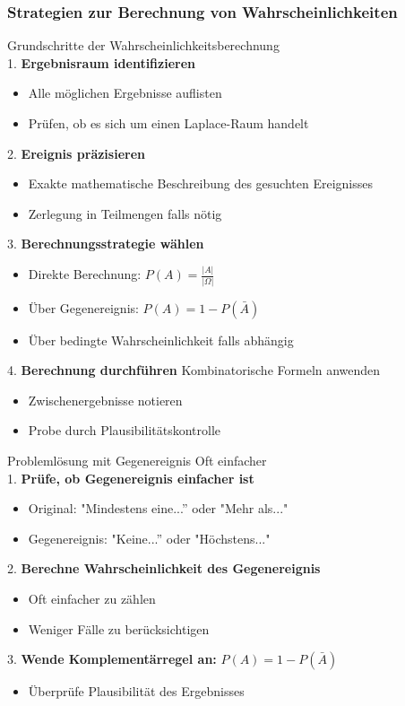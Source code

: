 \subsubsection{Strategien zur Berechnung von Wahrscheinlichkeiten}

\begin{KR}{Grundschritte der Wahrscheinlichkeitsberechnung}\\
1. \textbf{Ergebnisraum identifizieren}
   \begin{itemize}
   \item Alle möglichen Ergebnisse auflisten
   \item Prüfen, ob es sich um einen Laplace-Raum handelt
   \end{itemize}

2. \textbf{Ereignis präzisieren}
   \begin{itemize}
   \item Exakte mathematische Beschreibung des gesuchten Ereignisses
   \item Zerlegung in Teilmengen falls nötig
   \end{itemize}

3. \textbf{Berechnungsstrategie wählen}
   \begin{itemize}
   \item Direkte Berechnung: $P(A) = \frac{|A|}{|\Omega|}$
   \item Über Gegenereignis: $P(A) = 1 - P(\bar{A})$
   \item Über bedingte Wahrscheinlichkeit falls abhängig
   \end{itemize}

4. \textbf{Berechnung durchführen} Kombinatorische Formeln anwenden
   \begin{itemize}
   \item Zwischenergebnisse notieren
   \item Probe durch Plausibilitätskontrolle
   \end{itemize}
\end{KR}

\begin{concept}{Problemlösung mit Gegenereignis} Oft einfacher\\
1. \textbf{Prüfe, ob Gegenereignis einfacher ist}
   \begin{itemize}
   \item Original: "Mindestens eine...'' oder "Mehr als..."
   \item Gegenereignis: "Keine...'' oder "Höchstens..."
   \end{itemize}

2. \textbf{Berechne Wahrscheinlichkeit des Gegenereignis}
   \begin{itemize}
   \item Oft einfacher zu zählen
   \item Weniger Fälle zu berücksichtigen
   \end{itemize}

3. \textbf{Wende Komplementärregel an:} $P(A) = 1 - P(\bar{A})$
   \begin{itemize}
   \item Überprüfe Plausibilität des Ergebnisses
   \end{itemize}
\end{concept}

